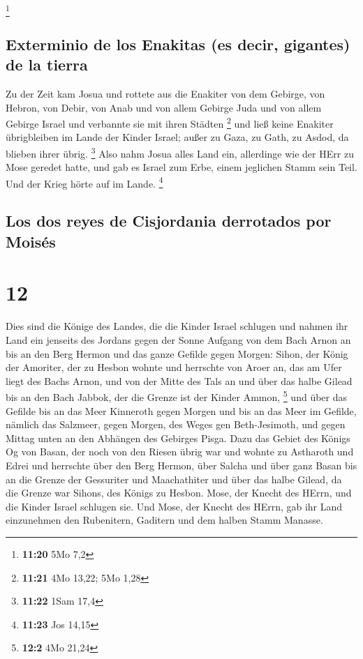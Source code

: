 \footnote{\textbf{11:20} 5Mo 7,2}

\hypertarget{exterminio-de-los-enakitas-es-decir-gigantes-de-la-tierra}{%
\subsection{Exterminio de los Enakitas (es decir, gigantes) de la
tierra}\label{exterminio-de-los-enakitas-es-decir-gigantes-de-la-tierra}}

 Zu der Zeit kam Josua und rottete aus die Enakiter von
dem Gebirge, von Hebron, von Debir, von Anab und von allem Gebirge Juda
und von allem Gebirge Israel und verbannte sie mit ihren Städten
\footnote{\textbf{11:21} 4Mo 13,22; 5Mo 1,28}  und ließ
keine Enakiter übrigbleiben im Lande der Kinder Israel; außer zu Gaza,
zu Gath, zu Asdod, da blieben ihrer übrig. \footnote{\textbf{11:22} 1Sam
  17,4}  Also nahm Josua alles Land ein, allerdinge wie
der HErr zu Mose geredet hatte, und gab es Israel zum Erbe, einem
jeglichen Stamm sein Teil. Und der Krieg hörte auf im Lande. \footnote{\textbf{11:23}
  Jos 14,15}

\hypertarget{los-dos-reyes-de-cisjordania-derrotados-por-moisuxe9s}{%
\subsection{Los dos reyes de Cisjordania derrotados por
Moisés}\label{los-dos-reyes-de-cisjordania-derrotados-por-moisuxe9s}}

\hypertarget{section-11}{%
\section{12}\label{section-11}}

 Dies sind die Könige des Landes, die die Kinder Israel
schlugen und nahmen ihr Land ein jenseits des Jordans gegen der Sonne
Aufgang von dem Bach Arnon an bis an den Berg Hermon und das ganze
Gefilde gegen Morgen:  Sihon, der König der Amoriter, der
zu Hesbon wohnte und herrschte von Aroer an, das am Ufer liegt des Bachs
Arnon, und von der Mitte des Tals an und über das halbe Gilead bis an
den Bach Jabbok, der die Grenze ist der Kinder Ammon, \footnote{\textbf{12:2}
  4Mo 21,24}  und über das Gefilde bis an das Meer
Kinneroth gegen Morgen und bis an das Meer im Gefilde, nämlich das
Salzmeer, gegen Morgen, des Weges gen Beth-Jesimoth, und gegen Mittag
unten an den Abhängen des Gebirges Pisga.  Dazu das Gebiet
des Königs Og von Basan, der noch von den Riesen übrig war und wohnte zu
Astharoth und Edrei  und herrschte über den Berg Hermon,
über Salcha und über ganz Basan bis an die Grenze der Gessuriter und
Maachathiter und über das halbe Gilead, da die Grenze war Sihons, des
Königs zu Hesbon.  Mose, der Knecht des HErrn, und die
Kinder Israel schlugen sie. Und Mose, der Knecht des HErrn, gab ihr Land
einzunehmen den Rubenitern, Gaditern und dem halben Stamm Manasse.

